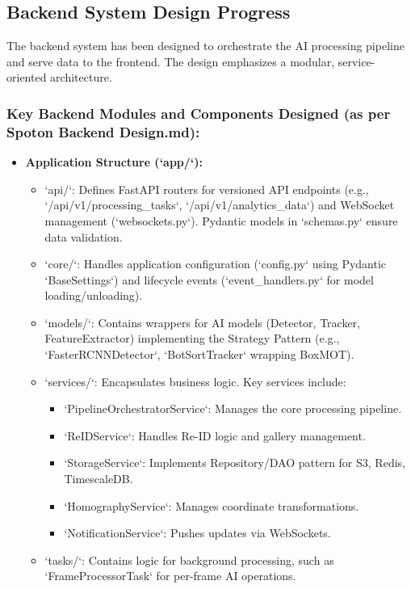 \subsection*{Backend System Design Progress}
\label{subsec:progress_backend}
The backend system has been designed to orchestrate the AI processing pipeline and serve data to the frontend. The design emphasizes a modular, service-oriented architecture.

\subsubsection*{Key Backend Modules and Components Designed (as per Spoton Backend Design.md):}
\begin{itemize}
    \item \textbf{Application Structure (`app/`):}
        \begin{itemize}
            \item `api/`: Defines FastAPI routers for versioned API endpoints (e.g., `/api/v1/processing\_tasks`, `/api/v1/analytics\_data`) and WebSocket management (`websockets.py`). Pydantic models in `schemas.py` ensure data validation.
            \item `core/`: Handles application configuration (`config.py` using Pydantic `BaseSettings`) and lifecycle events (`event\_handlers.py` for model loading/unloading).
            \item `models/`: Contains wrappers for AI models (Detector, Tracker, FeatureExtractor) implementing the Strategy Pattern (e.g., `FasterRCNNDetector`, `BotSortTracker` wrapping BoxMOT).
            \item `services/`: Encapsulates business logic. Key services include:
                \begin{itemize}
                    \item `PipelineOrchestratorService`: Manages the core processing pipeline.
                    \item `ReIDService`: Handles Re-ID logic and gallery management.
                    \item `StorageService`: Implements Repository/DAO pattern for S3, Redis, TimescaleDB.
                    \item `HomographyService`: Manages coordinate transformations.
                    \item `NotificationService`: Pushes updates via WebSockets.
                \end{itemize}
            \item `tasks/`: Contains logic for background processing, such as `FrameProcessorTask` for per-frame AI operations.

\end{itemize}
\end{itemize}
